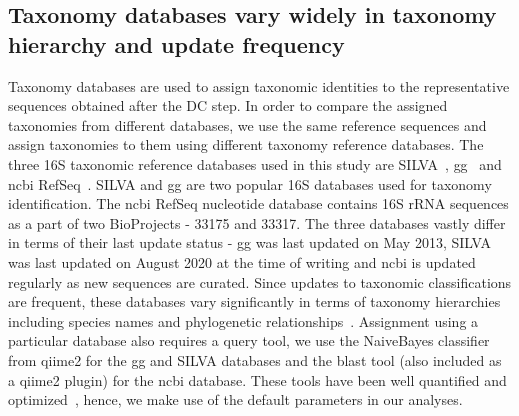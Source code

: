   \FloatBarrier

  \subsection*{Taxonomy databases vary widely in taxonomy hierarchy and update frequency}

  Taxonomy databases are used to assign taxonomic identities to the representative sequences obtained after the DC step.
  In order to compare the assigned taxonomies from different databases, we use the same reference sequences and assign taxonomies to them using different taxonomy reference databases.
  The three 16S taxonomic reference databases used in this study are SILVA~\cite{Quast2012}, \ac{gg}~\cite{DeSantis2006} and \ac{ncbi} RefSeq~\cite{Sayers2009}.
  SILVA and \ac{gg} are two popular 16S databases used for taxonomy identification.
  The \ac{ncbi} RefSeq nucleotide database contains 16S rRNA sequences as a part of two BioProjects - 33175 and 33317.
  The three databases vastly differ in terms of their last update status - \ac{gg} was last updated on May 2013, SILVA was last updated on August 2020 at the time of writing and \ac{ncbi} is updated regularly as new sequences are curated.
  Since updates to taxonomic classifications are frequent, these databases vary significantly in terms of taxonomy hierarchies including species names and phylogenetic relationships~\cite{Balvociute2017}.
  Assignment using a particular database also requires a query tool, we use the NaiveBayes classifier from \ac{qiime2} for the \ac{gg} and SILVA databases and the blast tool (also included as a \ac{qiime2} plugin) for the \ac{ncbi} database.
  These tools have been well quantified and optimized~\cite{bokulichOptimizingTaxonomicClassification2018}, hence, we make use of the default parameters in our analyses.

